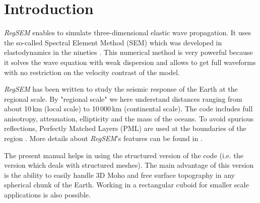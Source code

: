 \section{Introduction}


\textit{RegSEM} enables to simulate three-dimensional elastic wave propagation. It uses the so-called Spectral Element Method (SEM) which was developed in elastodynamics in the nineties . This numerical method is very powerful because it solves the wave equation with weak dispersion and allows to get full waveforms with no restriction on the velocity contrast of the model.

\textit{RegSEM} has been written to study the seismic response of the Earth at the regional scale. By "regional scale" we here understand distances ranging from about 10\,km (local scale) to 10\,000\,km (continental scale). The code includes full anisotropy, attenuation, ellipticity and the mass of the oceans. To avoid spurious reflections, Perfectly Matched Layers (PML) are used at the boundaries of the region . More details about \textit{RegSEM}'s features can be found in .

The present manual helps in using the structured version of the code (i.e. the version which deals
with structured meshes). The main advantage of this version is the ability to easily handle 3D Moho
and free surface topography in any spherical chunk of the Earth. Working in a rectangular cuboid for smaller scale applications is also possible. 
